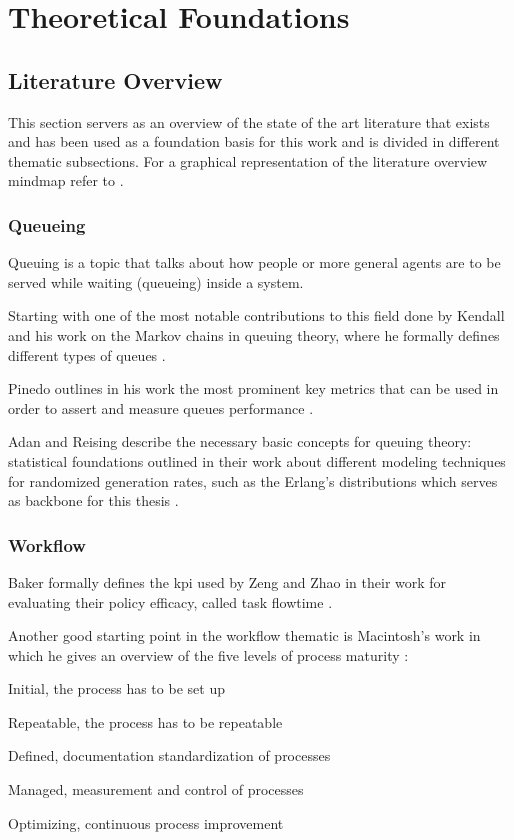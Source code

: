 \documentclass{seal_thesis}
\begin{document}
\chapter{Theoretical Foundations}
\label{ch:foundations}

\section{Literature Overview}
\label{sec:literature_overview}

This section servers as an overview of the state of the art literature that exists and has been used as a foundation basis for this work and is divided in different thematic subsections. For a graphical representation of the literature overview mindmap refer to .

\subsection{Queueing}

Queuing is a topic that talks about how people or more general agents are to be served while waiting (\ie queueing) inside a system.

Starting with one of the most notable contributions to this field done by Kendall and his work on the Markov chains in queuing theory, where he formally defines different types of queues \cite{Kendall1953}.

Pinedo outlines in his work the most prominent key metrics that can be used in order to assert and measure queues performance \cite{Pinedo2008}.

Adan and Reising describe the necessary basic concepts for queuing theory: statistical foundations outlined in their work about different modeling techniques for randomized generation rates, such as the Erlang's distributions which serves as backbone for this thesis \cite{Adan2016}.

\subsection{Workflow}
\label{subsec:workflow}

Baker formally defines the \gls{kpi} used by Zeng and Zhao in their work for evaluating their policy efficacy, called task flowtime \cite{Baker1974}.

Another good starting point in the workflow thematic is Macintosh's work in which he gives an overview of the five levels of process maturity \cite{Macintosh1993}:
\begin{enumerate*}
	\item Initial, the process has to be set up
	\item Repeatable, the process has to be repeatable
	\item Defined, documentation standardization of processes
	\item Managed, measurement and control of processes
	\item Optimizing, continuous process improvement
\end{enumerate*}
\end{document}
